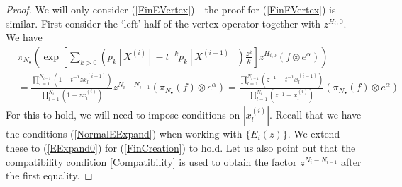 \documentclass{amsart}
\newcommand{\nd}{n_\bullet}
\newcommand{\Pol}{\mathrm{Pol}}
\theoremstyle{remark}
\numberwithin{thm}{section}
\numberwithin{equation}{section}
\begin{document}
\begin{proof}
We will only consider (\ref{FinEVertex})---the proof for (\ref{FinFVertex}) is similar.
First consider the `left' half of the vertex operator together with $z^{H_i,0}$. 
We have
\begin{align}
\nonumber
&\pi_{N_\bullet} \left(\exp\left[ \sum_{k>0}\left( p_k[X^{(i)}]-t^{-k}p_k[X^{(i-1)}] \right) \frac{z^k}{k}\right]z^{H_{i,0}} (f\otimes e^\alpha)\right) \\
\label{FinCreation}
&=
\frac{\displaystyle\prod_{l=1}^{N_{i-1}}\left(1-t^{-1}zx_{l}^{(i-1)}\right)}{\displaystyle\prod_{l=1}^{N_i} \left(1-zx_{l}^{(i)}\right)}
z^{N_i-N_{i-1}}
\left( \pi_{N_\bullet}(f)\otimes e^\alpha\right)
=
\frac{\displaystyle\prod_{l=1}^{N_{i-1}}\left(z^{-1}-t^{-1}x_{l}^{(i-1)}\right)}{\displaystyle\prod_{l=1}^{N_i} \left(z^{-1}-x_{l}^{(i)}\right)}
\left( \pi_{N_\bullet}(f)\otimes e^\alpha\right)
\end{align}
For this to hold, we will need to impose conditions on $|x_{l}^{(i)}|$.
Recall that we have the conditions (\ref{NormalEExpand}) when working with $\{E_i(z)\}$.
We extend these to (\ref{EExpand0}) for (\ref{FinCreation}) to hold. 
Let us also point out that the compatibility condition \eqref{Compatibility} is used to obtain the factor $z^{N_i-N_{i-1}}$ after the first equality.


\end{proof}
\end{document}
